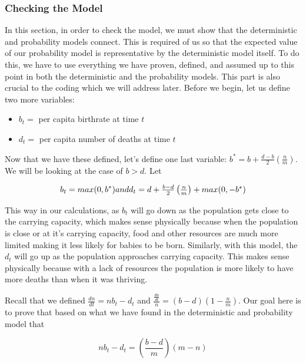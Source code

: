 \documentclass{article}\usepackage[]{graphicx}\usepackage[]{color}
\begin{document}
\subsubsection{Checking the Model}

In this section, in order to check the model, we must show that the deterministic and probability models connect. This is required of us so that the expected value of our probability model is representative by the deterministic model itself. To do this, we have to use everything we have proven, defined, and assumed up to this point in both the deterministic and the probability models. This part is also crucial to the coding which we will address later. Before we begin, let us define two more variables:

\begin{itemize}
\item \(b_t =\) per capita birthrate at time \(t\)

\item \(d_t =\) per capita number of deaths at time \(t\)
\end{itemize}

Now that we have these defined, let's define one last variable: \(b^* = b + \frac{d-b}{2} \left( \frac{n}{m}\right)\). We will be looking at the case of \(b > d\). Let 

\begin{equation}
b_t = max(0, b^*)$$ and $$d_t = d + \frac{b-d}{2} \left(\frac{n}{m}\right) + max(0, -b^*)
\end{equation}

\noindent This way in our calculations, as \(b_t\) will go down as the population gets close to the carrying capacity, which makes sense physically because when the population is close or at it's carrying capacity, food and other resources are much more limited making it less likely for babies to be born. Similarly, with this model, the \(d_t\) will go up as the population approaches carrying capacity. This makes sense physically because with a lack of resources the population is more likely to have more deaths than when it was thriving.

Recall that we defined \(\frac{dn}{dt} = nb_t-d_t\) and \(\frac{\frac{dn}{dt}}{n} = (b-d)\left(1-\frac{n}{m}\right)\). Our goal here is to prove that based on what we have found in the deterministic and probability model that 

\begin{equation}
nb_t-d_t = \left(\frac{b-d}{m}\right)(m-n)
\end{equation}
\end{document}

